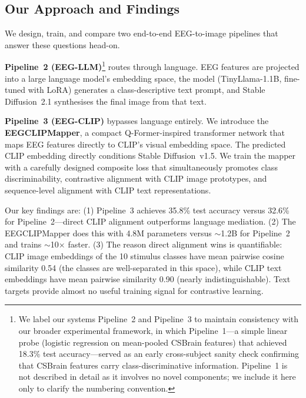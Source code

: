 \documentclass{article}
\begin{document}
\subsection{Our Approach and Findings}

We design, train, and compare two end-to-end EEG-to-image pipelines that answer these questions head-on.

\textbf{Pipeline~2 (EEG-LLM)}\footnote{We label our systems Pipeline~2 and Pipeline~3 to maintain consistency with our broader experimental framework, in which Pipeline~1---a simple linear probe (logistic regression on mean-pooled CSBrain features) that achieved 18.3\% test accuracy---served as an early cross-subject sanity check confirming that CSBrain features carry class-discriminative information. Pipeline~1 is not described in detail as it involves no novel components; we include it here only to clarify the numbering convention.} routes through language. EEG features are projected into a large language model's embedding space, the model (TinyLlama-1.1B, fine-tuned with LoRA) generates a class-descriptive text prompt, and Stable Diffusion~2.1 synthesises the final image from that text.

\textbf{Pipeline~3 (EEG-CLIP)} bypasses language entirely. We introduce the \textbf{EEGCLIPMapper}, a compact Q-Former-inspired transformer network that maps EEG features directly to CLIP's visual embedding space. The predicted CLIP embedding directly conditions Stable Diffusion~v1.5. We train the mapper with a carefully designed composite loss that simultaneously promotes class discriminability, contrastive alignment with CLIP image prototypes, and sequence-level alignment with CLIP text representations.

Our key findings are: (1) Pipeline~3 achieves 35.8\% test accuracy versus 32.6\% for Pipeline~2---direct CLIP alignment outperforms language mediation. (2) The EEGCLIPMapper does this with 4.8M parameters versus $\sim$1.2B for Pipeline~2 and trains $\sim$10$\times$ faster. (3) The reason direct alignment wins is quantifiable: CLIP image embeddings of the 10 stimulus classes have mean pairwise cosine similarity 0.54 (the classes are well-separated in this space), while CLIP text embeddings have mean pairwise similarity 0.90 (nearly indistinguishable). Text targets provide almost no useful training signal for contrastive learning.
\end{document}
